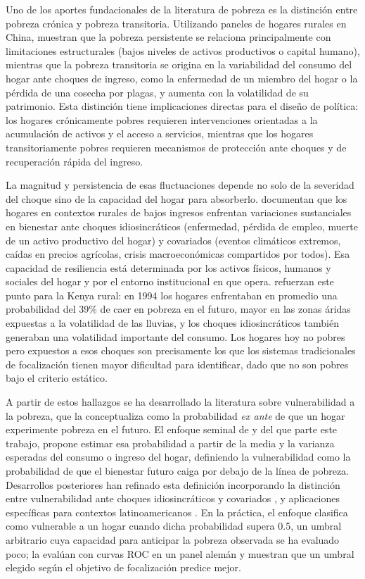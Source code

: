 \documentclass[12pt, letterpaper]{article}
\begin{document}
Uno de los aportes fundacionales de la literatura de pobreza es la
distinción entre pobreza crónica y pobreza transitoria. Utilizando
paneles de hogares rurales en China, \textcite{jalan2000} muestran que la
pobreza persistente se relaciona principalmente con limitaciones
estructurales (bajos niveles de activos productivos o capital humano),
mientras que la pobreza transitoria se origina en la variabilidad del
consumo del hogar ante choques de ingreso, como la enfermedad de un
miembro del hogar o la pérdida de una cosecha por plagas, y aumenta con la
volatilidad de su patrimonio. Esta
distinción tiene implicaciones directas para el diseño de política: los
hogares crónicamente pobres requieren intervenciones orientadas a la
acumulación de activos y el acceso a servicios, mientras que los hogares
transitoriamente pobres requieren mecanismos de protección ante choques y
de recuperación rápida del ingreso.

La magnitud y persistencia de esas fluctuaciones depende no solo de la
severidad del choque sino de la capacidad del hogar para absorberlo.
\textcite{dercon2000} documentan que los hogares en contextos rurales de
bajos ingresos enfrentan variaciones sustanciales en bienestar ante
choques idiosincráticos (enfermedad, pérdida de empleo, muerte de un
activo productivo del hogar) y covariados (eventos climáticos extremos, 
caídas en precios agrícolas, crisis macroeconómicas compartidos por todos). 
Esa capacidad de resiliencia está determinada por los activos físicos, 
humanos y sociales del hogar y
por el entorno institucional en que opera. \textcite{christiaensen2005}
refuerzan este punto para la Kenya rural: en 1994 los hogares enfrentaban
en promedio una probabilidad del 39\% de caer en pobreza en el futuro,
mayor en las zonas áridas expuestas a la volatilidad de las lluvias, y los
choques idiosincráticos también generaban una volatilidad importante del
consumo. Los hogares hoy no pobres pero expuestos a esos choques son
precisamente los que los sistemas tradicionales de focalización tienen
mayor dificultad para identificar, dado que no son pobres bajo el
criterio estático.

A partir de estos hallazgos se ha desarrollado la literatura sobre
vulnerabilidad a la pobreza, que la conceptualiza como la probabilidad
\emph{ex ante} de que un hogar experimente pobreza en el futuro. El
enfoque seminal de \textcite{chaudhuri2002} y del que parte este trabajo, 
propone estimar esa probabilidad a partir de la media y la varianza 
esperadas del consumo o
ingreso del hogar, definiendo la vulnerabilidad como la probabilidad de
que el bienestar futuro caiga por debajo de la línea de pobreza. 
Desarrollos posteriores han refinado esta definición incorporando la
distinción entre vulnerabilidad ante choques idiosincráticos y covariados
\parencite{dercon2002}, y aplicaciones específicas para contextos
latinoamericanos \parencite{bergolo2010}. En la
práctica, el enfoque clasifica como vulnerable a un hogar cuando dicha
probabilidad supera 0.5, un umbral arbitrario cuya capacidad para
anticipar la pobreza observada se ha evaluado poco; \textcite{hohberg2018}
la evalúan con curvas ROC en un panel alemán y muestran que un umbral
elegido según el objetivo de focalización predice mejor.
\end{document}
